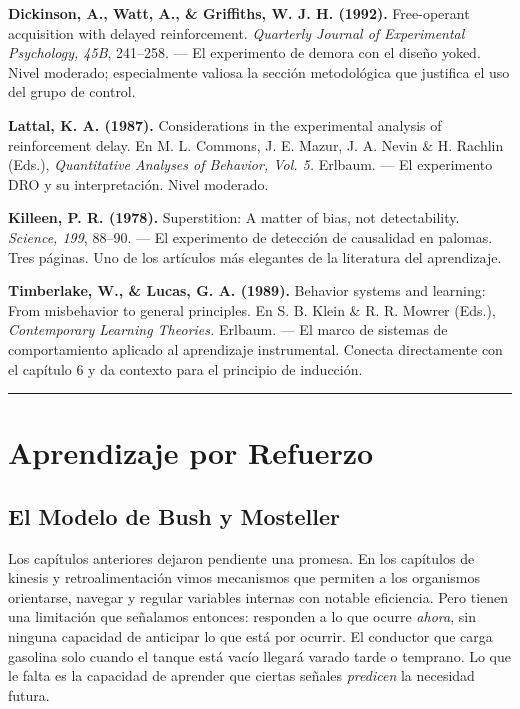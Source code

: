 \documentclass[
  letterpaper,
  DIV=11,
  numbers=noendperiod]{scrreprt}
\begin{document}
\begin{tcolorbox}[enhanced jigsaw, arc=.35mm, bottomrule=.15mm, breakable, colback=white, colframe=quarto-callout-note-color-frame, left=2mm, leftrule=.75mm, opacityback=0, rightrule=.15mm, toprule=.15mm]
\textbf{Dickinson, A., Watt, A., \& Griffiths, W. J. H. (1992).}
Free-operant acquisition with delayed reinforcement. \emph{Quarterly
Journal of Experimental Psychology, 45B}, 241--258. --- El experimento
de demora con el diseño yoked. Nivel moderado; especialmente valiosa la
sección metodológica que justifica el uso del grupo de control.

\textbf{Lattal, K. A. (1987).} Considerations in the experimental
analysis of reinforcement delay. En M. L. Commons, J. E. Mazur, J. A.
Nevin \& H. Rachlin (Eds.), \emph{Quantitative Analyses of Behavior,
Vol. 5.} Erlbaum. --- El experimento DRO y su interpretación. Nivel
moderado.

\textbf{Killeen, P. R. (1978).} Superstition: A matter of bias, not
detectability. \emph{Science, 199}, 88--90. --- El experimento de
detección de causalidad en palomas. Tres páginas. Uno de los artículos
más elegantes de la literatura del aprendizaje.

\textbf{Timberlake, W., \& Lucas, G. A. (1989).} Behavior systems and
learning: From misbehavior to general principles. En S. B. Klein \& R.
R. Mowrer (Eds.), \emph{Contemporary Learning Theories.} Erlbaum. --- El
marco de sistemas de comportamiento aplicado al aprendizaje
instrumental. Conecta directamente con el capítulo 6 y da contexto para
el principio de inducción.

\begin{center}\rule{0.5\linewidth}{0.5pt}\end{center}


\chapter{Aprendizaje por Refuerzo}\label{aprendizaje-por-refuerzo}

\section{El Modelo de Bush y
Mosteller}\label{el-modelo-de-bush-y-mosteller}

Los capítulos anteriores dejaron pendiente una promesa. En los capítulos
de kinesis y retroalimentación vimos mecanismos que permiten a los
organismos orientarse, navegar y regular variables internas con notable
eficiencia. Pero tienen una limitación que señalamos entonces: responden
a lo que ocurre \emph{ahora}, sin ninguna capacidad de anticipar lo que
está por ocurrir. El conductor que carga gasolina solo cuando el tanque
está vacío llegará varado tarde o temprano. Lo que le falta es la
capacidad de aprender que ciertas señales \emph{predicen} la necesidad
futura.


\end{tcolorbox}
\end{document}
